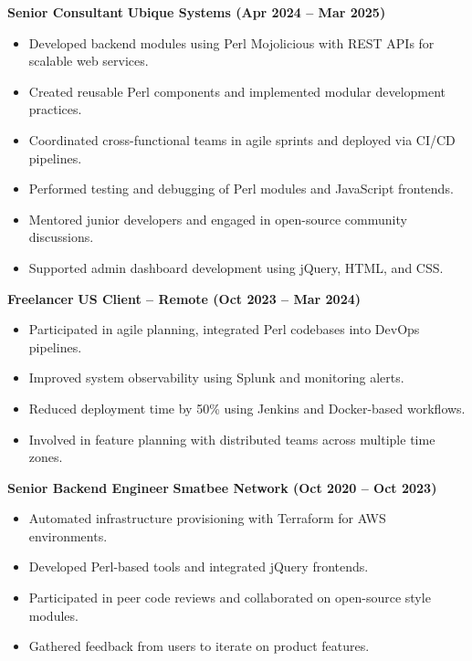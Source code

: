 \documentclass[11pt,a4paper]{article}
\begin{document}
\textbf{Senior Consultant} \hfill \textbf{Ubique Systems (Apr 2024 – Mar 2025)} \\
\begin{itemize}[leftmargin=*]
  \item Developed backend modules using Perl Mojolicious with REST APIs for scalable web services.
  \item Created reusable Perl components and implemented modular development practices.
  \item Coordinated cross-functional teams in agile sprints and deployed via CI/CD pipelines.
  \item Performed testing and debugging of Perl modules and JavaScript frontends.
  \item Mentored junior developers and engaged in open-source community discussions.
  \item Supported admin dashboard development using jQuery, HTML, and CSS.
\end{itemize}

\vspace{1em}
\textbf{Freelancer} \hfill \textbf{US Client – Remote (Oct 2023 – Mar 2024)} \\
\begin{itemize}[leftmargin=*]
  \item Participated in agile planning, integrated Perl codebases into DevOps pipelines.
  \item Improved system observability using Splunk and monitoring alerts.
  \item Reduced deployment time by 50\% using Jenkins and Docker-based workflows.
  \item Involved in feature planning with distributed teams across multiple time zones.
\end{itemize}

\vspace{1em}
\textbf{Senior Backend Engineer} \hfill \textbf{Smatbee Network (Oct 2020 – Oct 2023)} \\
\begin{itemize}[leftmargin=*]
  \item Automated infrastructure provisioning with Terraform for AWS environments.
  \item Developed Perl-based tools and integrated jQuery frontends.
  \item Participated in peer code reviews and collaborated on open-source style modules.
  \item Gathered feedback from users to iterate on product features.
\end{itemize}
\end{document}
